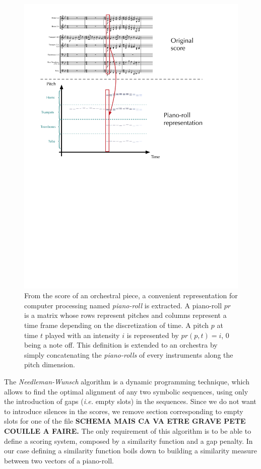 \documentclass[twoside,twocolumn]{article}
\begin{document}
\begin{figure}[ht]
\centering
\includegraphics[scale=0.35]{Data_representation/from_score_to_pianoroll}
\caption{From the score of an orchestral piece, a convenient representation for computer processing named \textit{piano-roll} is extracted. A piano-roll $pr$ is a matrix whose rows represent pitches and columns represent a time frame depending on the discretization of time. A pitch $p$ at time $t$ played with an intensity $i$ is represented by $pr(p,t) = i$, $0$ being a note off. This definition is extended to an orchestra by simply concatenating the \textit{piano-rolls} of every instruments along the pitch dimension.}
\label{fig:piano-roll}
\end{figure}

The \textit{Needleman-Wunsch}  algorithm \cite{NEEDLEMAN1970443} is a dynamic programming technique, which allows to find the optimal alignment of any two symbolic sequences, using only the introduction of gaps (\textit{i.e.} empty slots) in the sequences. Since we do not want to introduce silences in the scores, we remove section corresponding to empty slots for one of the file \textbf{SCHEMA MAIS CA VA ETRE GRAVE PETE COUILLE A FAIRE.}
The only requirement of this algorithm is to be able to define a scoring system, composed by a similarity function and a gap penalty. In our case defining a similarity function boils down to building a similarity measure between two vectors of a piano-roll.
\end{document}
